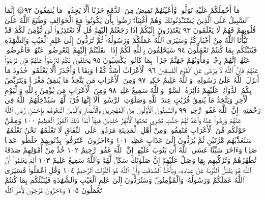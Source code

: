 مَآ أَحْمِلُكُمْ عَلَيْهِ تَوَلَّوا۟ وَّأَعْيُنُهُمْ تَفِيضُ مِنَ ٱلدَّمْعِ
حَزَنًا أَلَّا يَجِدُوا۟ مَا يُنفِقُونَ ٩٢۞ إِنَّمَا ٱلسَّبِيلُ عَلَى
ٱلَّذِينَ يَسْتَـْٔذِنُونَكَ وَهُمْ أَغْنِيَآءُۚ رَضُوا۟ بِأَن يَكُونُوا۟
مَعَ ٱلْخَوَالِفِ وَطَبَعَ ٱللَّهُ عَلَىٰ قُلُوبِهِمْ فَهُمْ لَا يَعْلَمُونَ ٩٣
يَعْتَذِرُونَ إِلَيْكُمْ إِذَا رَجَعْتُمْ إِلَيْهِمْۚ قُل لَّا تَعْتَذِرُوا۟
لَن نُّؤْمِنَ لَكُمْ قَدْ نَبَّأَنَا ٱللَّهُ مِنْ أَخْبَارِكُمْۚ وَسَيَرَى
ٱللَّهُ عَمَلَكُمْ وَرَسُولُهُۥ ثُمَّ تُرَدُّونَ إِلَىٰ عَٰلِمِ ٱلْغَيْبِ وَٱلشَّهَٰدَةِ
فَيُنَبِّئُكُم بِمَا كُنتُمْ تَعْمَلُونَ ٩٤ سَيَحْلِفُونَ بِٱللَّهِ
لَكُمْ إِذَا ٱنقَلَبْتُمْ إِلَيْهِمْ لِتُعْرِضُوا۟ عَنْهُمْۖ فَأَعْرِضُوا۟
عَنْهُمْۖ إِنَّهُمْ رِجْسࣱۖ وَمَأْوَىٰهُمْ جَهَنَّمُ جَزَآءَۢ بِمَا كَانُوا۟
يَكْسِبُونَ ٩٥ يَحْلِفُونَ لَكُمْ لِتَرْضَوْا۟ عَنْهُمْۖ فَإِن
تَرْضَوْا۟ عَنْهُمْ فَإِنَّ ٱللَّهَ لَا يَرْضَىٰ عَنِ ٱلْقَوْمِ ٱلْفَٰسِقِينَ ٩٦
ٱلْأَعْرَابُ أَشَدُّ كُفْرࣰا وَنِفَاقࣰا وَأَجْدَرُ أَلَّا يَعْلَمُوا۟ حُدُودَ
مَآ أَنزَلَ ٱللَّهُ عَلَىٰ رَسُولِهِۦۗ وَٱللَّهُ عَلِيمٌ حَكِيمࣱ ٩٧ وَمِنَ
ٱلْأَعْرَابِ مَن يَتَّخِذُ مَا يُنفِقُ مَغْرَمࣰا وَيَتَرَبَّصُ بِكُمُ
ٱلدَّوَآئِرَۚ عَلَيْهِمْ دَآئِرَةُ ٱلسَّوْءِۗ وَٱللَّهُ سَمِيعٌ عَلِيمࣱ ٩٨ وَمِنَ
ٱلْأَعْرَابِ مَن يُؤْمِنُ بِٱللَّهِ وَٱلْيَوْمِ ٱلْأٓخِرِ وَيَتَّخِذُ مَا يُنفِقُ
قُرُبَٰتٍ عِندَ ٱللَّهِ وَصَلَوَٰتِ ٱلرَّسُولِۚ أَلَآ إِنَّهَا قُرْبَةࣱ لَّهُمْۚ
سَيُدْخِلُهُمُ ٱللَّهُ فِي رَحْمَتِهِۦٓۚ إِنَّ ٱللَّهَ غَفُورࣱ رَّحِيمࣱ ٩٩
وَٱلسَّٰبِقُونَ ٱلْأَوَّلُونَ مِنَ ٱلْمُهَٰجِرِينَ وَٱلْأَنصَارِ وَٱلَّذِينَ
ٱتَّبَعُوهُم بِإِحْسَٰنࣲ رَّضِيَ ٱللَّهُ عَنْهُمْ وَرَضُوا۟ عَنْهُ وَأَعَدَّ
لَهُمْ جَنَّٰتࣲ تَجْرِي تَحْتَهَا ٱلْأَنْهَٰرُ خَٰلِدِينَ فِيهَآ أَبَدࣰاۚ
ذَٰلِكَ ٱلْفَوْزُ ٱلْعَظِيمُ ١٠٠ وَمِمَّنْ حَوْلَكُم مِّنَ ٱلْأَعْرَابِ
مُنَٰفِقُونَۖ وَمِنْ أَهْلِ ٱلْمَدِينَةِ مَرَدُوا۟ عَلَى ٱلنِّفَاقِ لَا تَعْلَمُهُمْۖ
نَحْنُ نَعْلَمُهُمْۚ سَنُعَذِّبُهُم مَّرَّتَيْنِ ثُمَّ يُرَدُّونَ إِلَىٰ عَذَابٍ
عَظِيمࣲ ١٠١ وَءَاخَرُونَ ٱعْتَرَفُوا۟ بِذُنُوبِهِمْ خَلَطُوا۟ عَمَلࣰا صَٰلِحࣰا
وَءَاخَرَ سَيِّئًا عَسَى ٱللَّهُ أَن يَتُوبَ عَلَيْهِمْۚ إِنَّ ٱللَّهَ غَفُورࣱ رَّحِيمٌ ١٠٢
خُذْ مِنْ أَمْوَٰلِهِمْ صَدَقَةࣰ تُطَهِّرُهُمْ وَتُزَكِّيهِم بِهَا وَصَلِّ عَلَيْهِمْۖ
إِنَّ صَلَوٰتَكَ سَكَنࣱ لَّهُمْۗ وَٱللَّهُ سَمِيعٌ عَلِيمٌ ١٠٣ أَلَمْ يَعْلَمُوٓا۟ أَنَّ
ٱللَّهَ هُوَ يَقْبَلُ ٱلتَّوْبَةَ عَنْ عِبَادِهِۦ وَيَأْخُذُ ٱلصَّدَقَٰتِ وَأَنَّ
ٱللَّهَ هُوَ ٱلتَّوَّابُ ٱلرَّحِيمُ ١٠٤ وَقُلِ ٱعْمَلُوا۟ فَسَيَرَى ٱللَّهُ عَمَلَكُمْ
وَرَسُولُهُۥ وَٱلْمُؤْمِنُونَۖ وَسَتُرَدُّونَ إِلَىٰ عَٰلِمِ ٱلْغَيْبِ وَٱلشَّهَٰدَةِ
فَيُنَبِّئُكُم بِمَا كُنتُمْ تَعْمَلُونَ ١٠٥ وَءَاخَرُونَ مُرْجَوْنَ لِأَمْرِ ٱللَّهِ
